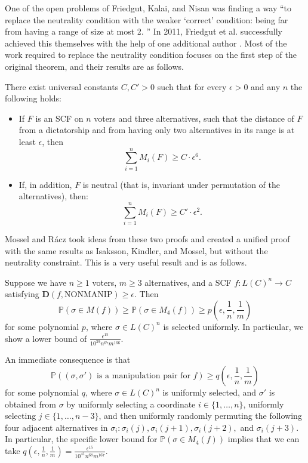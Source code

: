 	One of the open problems of Friedgut, Kalai, and Nisan was finding a way ``to replace the neutrality condition with the weaker `correct' condition: being far from having a range of size at most 2. \cite{friedgut2008elections}'' In 2011, Friedgut et al. successfully achieved this themselves with the help of one additional author \cite{friedgut2011quantitative}. Most of the work required to replace the neutrality condition focuses on the first step of the original theorem, and their results are as follows.
	\begin{theorem}
		There exist universal constants $C, C' > 0$ such that for every $\epsilon > 0$ and any $n$ the following holds:
		\begin{itemize}
			\item If $F$ is an SCF on $n$ voters and three alternatives, such that the distance of $F$ from a dictatorship and from having only two alternatives in its range is at least $\epsilon$, then
			\[
				\sum_{i=1}^n M_i(F) \ge C \cdot \epsilon^6.
			\]
			\item If, in addition, $F$ is neutral (that is, invariant under permutation of the alternatives), then:
			\[
				\sum_{i=1}^n M_i(F) \ge C' \cdot \epsilon^2.
			\]
		\end{itemize}
	\end{theorem}

	Mossel and R\'{a}cz \cite{mossel2011quantitative} took ideas from these two proofs and created a unified proof with the same results as Isaksson, Kindler, and Mossel, but without the neutrality constraint. This is a very useful result and is as follows.
	\begin{theorem}
		Suppose we have $n \ge 1$ voters, $m \ge 3$ alternatives, and a SCF $f : L(C)^n \rightarrow C$ satisfying $\mathbf{D}(f, \mathrm{NONMANIP}) \ge \epsilon$. Then
		\[
			\mathbb{P}(\sigma \in M(f)) \ge \mathbb{P}(\sigma \in M_4(f)) \ge p \left( \epsilon, \frac{1}{n}, \frac{1}{m} \right)
		\]
		for some polynomial $p$, where $\sigma \in L(C)^n$ is selected uniformly. In particular, we show a lower bound of $\frac{\epsilon^{15}}{10^{39} n^{67} m^{166}}$.

		An immediate consequence is that
		\[
			\mathbb{P}((\sigma, \sigma') \text{ is a manipulation pair for } f) \ge q \left( \epsilon, \frac{1}{n}, \frac{1}{m} \right)
		\]
		for some polynomial $q$, where $\sigma \in L(C)^n$ is uniformly selected, and $\sigma'$ is obtained from $\sigma$ by uniformly selecting a coordinate $i \in \{ 1, \ldots, n \}$, uniformly selecting $j \in \{ 1, \ldots, n-3 \}$, and then uniformly randomly permuting the following four adjacent alternatives in $\sigma_i: \sigma_i(j), \sigma_i(j+1), \sigma_i(j+2),$ and $\sigma_i(j+3)$. In particular, the specific lower bound for $\mathbb{P}(\sigma \in M_4(f))$ implies that we can take $q \left( \epsilon, \frac{1}{n}, \frac{1}{m} \right) = \frac{\epsilon^{15}}{10^{41} n^{68} m^{167}}$.
	\end{theorem}


